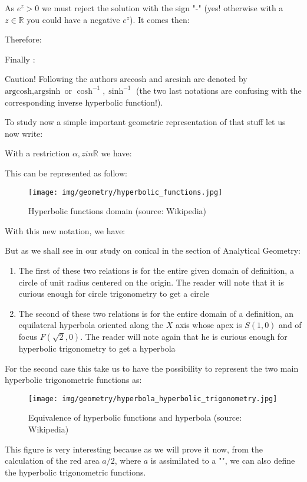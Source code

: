 	As $e^{z}>0$ we must reject the solution with the sign "-" (yes! otherwise with a $z \in \mathbb{R}$ you could have a negative $e^z$). It comes then:
	
	Therefore:
	
	Finally \label{inverse hyperbolic to logarithm}:
	
	
	\begin{tcolorbox}[colback=red!5,borderline={1mm}{2mm}{red!5},arc=0mm,boxrule=0pt]
	\bcbombe Caution! Following the authors $\text{arccosh}$ and $\text{arcsinh}$ are denoted by $\text{argcosh}, \text{argsinh}$ or $\cosh^{-1}, \sinh^{-1}$ (the two last notations are confusing with the corresponding inverse hyperbolic function!).
	\end{tcolorbox}
	
	
	To study now a simple important geometric representation of that stuff let us now write:
	
	With a restriction $\alpha,z in \mathbb{R}$ we have:
	
	This can be represented as follow:
	\begin{figure}[H]
	\centering
	\texttt{[image: img/geometry/hyperbolic\_functions.jpg]}
	\caption[Hyperbolic functions domain]{Hyperbolic functions domain (source: Wikipedia)}
	\end{figure}
	With this new notation, we have:
	
	But as we shall see in our study on conical in the section of Analytical Geometry:
	\begin{enumerate}
		\item The first of these two relations is for the entire given domain of definition, a circle of unit radius centered on the origin. The reader will note that it is curious enough for circle trigonometry to get a circle \Winkey
		\item The second of these two relations is for the entire domain of a definition, an equilateral hyperbola oriented along the $X$ axis whose apex is $S (1,0)$ and of focus $F(\sqrt{2},0)$. The reader will note again that he is curious enough for hyperbolic trigonometry to get a hyperbola \Winkey
	\end{enumerate}
	For the second case this take us to have the possibility to represent the two main hyperbolic trigonometric functions as:
	\begin{figure}[H]
	\centering
	\texttt{[image: img/geometry/hyperbola\_hyperbolic\_trigonometry.jpg]}
	\caption[Equivalence of hyperbolic functions and hyperbola]{Equivalence of hyperbolic functions and hyperbola (source: Wikipedia)}
	\end{figure}
	This figure is very interesting because as we will prove it now, from the calculation of the red area $a/2$, where $a$ is assimilated to a "", we can also define the hyperbolic trigonometric functions.
	
